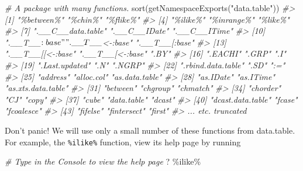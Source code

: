 \documentclass[
]{book}
\newenvironment{Shaded}{\begin{snugshade}}{\end{snugshade}}
\newcommand{\AttributeTok}[1]{\textcolor[rgb]{0.77,0.63,0.00}{#1}}
\newcommand{\CommentTok}[1]{\textcolor[rgb]{0.56,0.35,0.01}{\textit{#1}}}
\newcommand{\FunctionTok}[1]{\textcolor[rgb]{0.00,0.00,0.00}{#1}}
\newcommand{\NormalTok}[1]{#1}
\newcommand{\StringTok}[1]{\textcolor[rgb]{0.31,0.60,0.02}{#1}}
\begin{document}
\begin{Shaded}
\begin{Highlighting}[]
\CommentTok{\# A package with many functions.}
\FunctionTok{sort}\NormalTok{(}\FunctionTok{getNamespaceExports}\NormalTok{(}\StringTok{"data.table"}\NormalTok{))}
\CommentTok{\#\textgreater{}   [1] "\%between\%"          "\%chin\%"             "\%flike\%"           }
\CommentTok{\#\textgreater{}   [4] "\%ilike\%"            "\%inrange\%"          "\%like\%"            }
\CommentTok{\#\textgreater{}   [7] ".\_\_C\_\_data.table"   ".\_\_C\_\_IDate"        ".\_\_C\_\_ITime"       }
\CommentTok{\#\textgreater{}  [10] ".\_\_T\_\_$:base"       ".\_\_T\_\_$\textless{}{-}:base"     ".\_\_T\_\_[:base"      }
\CommentTok{\#\textgreater{}  [13] ".\_\_T\_\_[[\textless{}{-}:base"    ".\_\_T\_\_[\textless{}{-}:base"     ".BY"               }
\CommentTok{\#\textgreater{}  [16] ".EACHI"             ".GRP"               ".I"                }
\CommentTok{\#\textgreater{}  [19] ".Last.updated"      ".N"                 ".NGRP"             }
\CommentTok{\#\textgreater{}  [22] ".rbind.data.table"  ".SD"                ":="                }
\CommentTok{\#\textgreater{}  [25] "address"            "alloc.col"          "as.data.table"     }
\CommentTok{\#\textgreater{}  [28] "as.IDate"           "as.ITime"           "as.xts.data.table" }
\CommentTok{\#\textgreater{}  [31] "between"            "chgroup"            "chmatch"           }
\CommentTok{\#\textgreater{}  [34] "chorder"            "CJ"                 "copy"              }
\CommentTok{\#\textgreater{}  [37] "cube"               "data.table"         "dcast"             }
\CommentTok{\#\textgreater{}  [40] "dcast.data.table"   "fcase"              "fcoalesce"         }
\CommentTok{\#\textgreater{}  [43] "fifelse"            "fintersect"         "first"   }
\CommentTok{\#\textgreater{}  ... etc. truncated}
\end{Highlighting}
\end{Shaded}

Don't panic! We will use only a small number of these functions from data.table. For example, the \texttt{\%ilike\%} function, view its help page by running

\begin{Shaded}
\begin{Highlighting}[]
\CommentTok{\# Type in the Console to view the help page }
\NormalTok{? }\StringTok{\textasciigrave{}}\AttributeTok{\%ilike\%}\StringTok{\textasciigrave{}} 
\end{Highlighting}
\end{Shaded}
\end{document}
